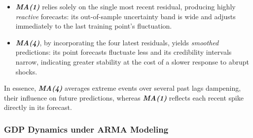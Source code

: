 \documentclass{Configuration_Files/PoliMi3i_thesis}
\begin{document}
\begin{itemize}
  \item \textbf{\textit{MA(1)}} relies solely on the single most recent residual, producing highly \emph{reactive} forecasts: its out-of-sample uncertainty band is wide and adjusts immediately to the last training point’s fluctuation.
  \item \textbf{\textit{MA(4)}}, by incorporating the four latest residuals, yields \emph{smoothed} predictions: its point forecasts fluctuate less and its credibility intervals narrow, indicating greater stability at the cost of a slower response to abrupt shocks.
\end{itemize}

In essence, \textbf{\textit{MA(4)}} averages extreme events over several past lags dampening, their influence on future predictions, whereas \textbf{\textit{MA(1)}} reflects each recent spike directly in its forecast.

\bigskip






\subsubsection{GDP Dynamics under ARMA Modeling}
\end{document}
